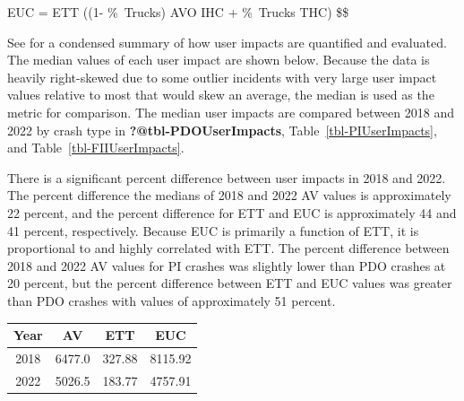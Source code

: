 \documentclass[
  letterpaper,
  authoryear]{elsarticle}
\begin{document}
EUC = ETT \times ((1- \%~Trucks) \times AVO \times IHC + \%~Trucks
\times THC) \$\$

See \citet{schultz_analysis_2023} for a condensed summary of how user
impacts are quantified and evaluated. The median values of each user
impact are shown below. Because the data is heavily right-skewed due to
some outlier incidents with very large user impact values relative to
most that would skew an average, the median is used as the metric for
comparison. The median user impacts are compared between 2018 and 2022
by crash type in \textbf{?@tbl-PDOUserImpacts},
Table~\ref{tbl-PIUserImpacts}, and Table~\ref{tbl-FIIUserImpacts}.

There is a significant percent difference between user impacts in 2018
and 2022. The percent difference the medians of 2018 and 2022 AV values
is approximately 22 percent, and the percent difference for ETT and EUC
is approximately 44 and 41 percent, respectively. Because EUC is
primarily a function of ETT, it is proportional to and highly correlated
with ETT. The percent difference between 2018 and 2022 AV values for PI
crashes was slightly lower than PDO crashes at 20 percent, but the
percent difference between ETT and EUC values was greater than PDO
crashes with values of approximately 51 percent.

\begin{table}
\centering
\begin{tabular}[t]{c|c|c|c}
\hline
Year & AV & ETT & EUC\\
\hline
2018 & 6477.0 & 327.88 & 8115.92\\
\hline
2022 & 5026.5 & 183.77 & 4757.91\\
\hline
\end{tabular}
\end{table}

\begin{table}

\caption{\label{tbl-PIUserImpacts}Median User Impacts of PI Crashes}


\end{table}%
\end{document}
